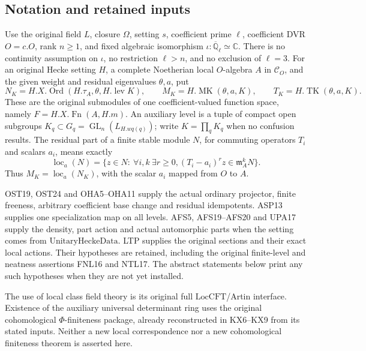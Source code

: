 \documentclass[11pt,a4paper]{article}
\numberwithin{equation}{section}
\theoremstyle{remark}\newtheorem{remark}[theorem]{Remark}
\begin{document}
\subsection{Notation and retained inputs}

Use the original field \(L\), closure \(\Omega\), setting \(s\),
coefficient prime \(\ell\), coefficient DVR \(O=c.O\), rank
\(n\geq1\), and fixed algebraic isomorphism
\(\iota:\overline{\mathbb Q}_\ell\simeq\mathbb C\).
There is no continuity assumption on \(\iota\), no restriction
\(\ell>n\), and no exclusion of \(\ell=3\).
For an original Hecke setting \(H\), a complete Noetherian local
\(O\)-algebra \(A\) in \(\mathcal C_O\), and the given weight
and residual eigenvalues \(\theta,a\), put
\[
 N_K=H.X.\operatorname{Ord}(H.\tau_A,\theta,H.\operatorname{lev}K),
 \qquad M_K=H.\operatorname{MK}(\theta,a,K),
 \qquad T_K=H.\operatorname{TK}(\theta,a,K).
 \tag{HLM.1}
\]
These are the original submodules of one coefficient-valued
function space, namely \(F=H.X.\operatorname{Fn}(A,H.m)\).
An auxiliary level is a tuple of compact open subgroups
\(K_q\subset G_q=\operatorname{GL}_n(L_{H.wq(q)})\);
write \(K=\prod_qK_q\) when no confusion results.
The residual part of a finite stable module \(N\), for commuting
operators \(T_i\) and scalars \(a_i\), means exactly
\[
 \operatorname{loc}_a(N)=
 \{z\in N:\ \forall i,k\ \exists r\geq0,
                    (T_i-a_i)^rz\in\mathfrak m_A^kN\}.
 \tag{HLM.2}
\]
Thus \(M_K=\operatorname{loc}_a(N_K)\), with the scalar
\(a_i\) mapped from \(O\) to \(A\).

OST19, OST24 and OHA5--OHA11 supply the actual ordinary projector,
finite freeness, arbitrary coefficient base change and residual
idempotents.  ASP13 supplies one specialization map on all levels.
AFS5, AFS19--AFS20 and UPA17 supply the density, part action and
actual automorphic parts when the setting comes from
\(\mathrm{UnitaryHeckeData}\).  LTP supplies the original sections
and their exact local actions.  Their hypotheses are retained,
including the original finite-level and neatness assertions FNL16
and NTL17.  The abstract statements below print any such hypotheses
when they are not yet installed.

The use of local class field theory is its original full
\(\mathrm{LocCFT}\)/Artin interface.  Existence of the auxiliary
universal determinant ring uses the original cohomological
\(\Phi\)-finiteness package, already reconstructed in KX6--KX9
from its stated inputs.  Neither a new local correspondence nor a
new cohomological finiteness theorem is asserted here.
\end{document}
